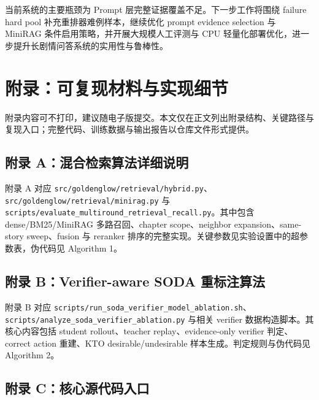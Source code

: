 \documentclass[UTF8,a4paper,12pt]{ctexart}
\newcommand{\code}[1]{\texttt{#1}}
\begin{document}
当前系统的主要瓶颈为 Prompt 层完整证据覆盖不足。下一步工作将围绕 failure hard pool 补充重排器难例样本，继续优化 prompt evidence selection 与 MiniRAG 条件启用策略，并开展大规模人工评测与 CPU 轻量化部署优化，进一步提升长剧情问答系统的实用性与鲁棒性。

\appendix
\section{附录：可复现材料与实现细节}

附录内容可不打印，建议随电子版提交。本文仅在正文列出附录结构、关键路径与复现入口；完整代码、训练数据与输出报告以仓库文件形式提供。

\subsection{附录 A：混合检索算法详细说明}

附录 A 对应 \code{src/goldenglow/retrieval/hybrid.py}、\code{src/goldenglow/retrieval/minirag.py} 与 \code{scripts/evaluate\_multiround\_retrieval\_recall.py}。其中包含 dense/BM25/MiniRAG 多路召回、chapter scope、neighbor expansion、same-story sweep、fusion 与 reranker 排序的完整实现。关键参数见实验设置中的超参数表，伪代码见 Algorithm 1。

\subsection{附录 B：Verifier-aware SODA 重标注算法}

附录 B 对应 \code{scripts/run\_soda\_verifier\_model\_ablation.sh}、\code{scripts/analyze\_soda\_verifier\_ablation.py} 与相关 verifier 数据构造脚本。其核心内容包括 student rollout、teacher replay、evidence-only verifier 判定、correct action 重建、KTO desirable/undesirable 样本生成。判定规则与伪代码见 Algorithm 2。

\subsection{附录 C：核心源代码入口}
\end{document}
